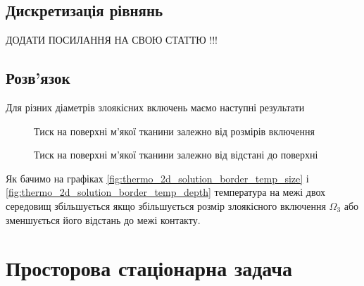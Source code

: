 \subsection{Дискретизація рівнянь}

ДОДАТИ ПОСИЛАННЯ НА СВОЮ СТАТТЮ !!!

\subsection{Розв'язок}

Для різних діаметрів злоякісних включень маємо наступні результати

\begin{figure}[ht!]
    \centering
    \caption{Тиск на поверхні м'якої тканини залежно від розмірів включення}
    \label{fig:elasticity_2d_solution_border_pressure_size}
\end{figure}

\begin{figure}[ht!]
    \centering
    \caption{Тиск на поверхні м'якої тканини залежно від відстані до поверхні}
    \label{fig:elasticity_2d_solution_border_pressure_depth}
\end{figure}

Як бачимо на графіках \ref{fig:thermo_2d_solution_border_temp_size} і \ref{fig:thermo_2d_solution_border_temp_depth}
температура на межі двох середовищ збільшується якщо збільшується розмір злоякісного включення $\Omega_3$ або 
зменшується його відстань до межі контакту.


\section{Просторова стаціонарна задача}

